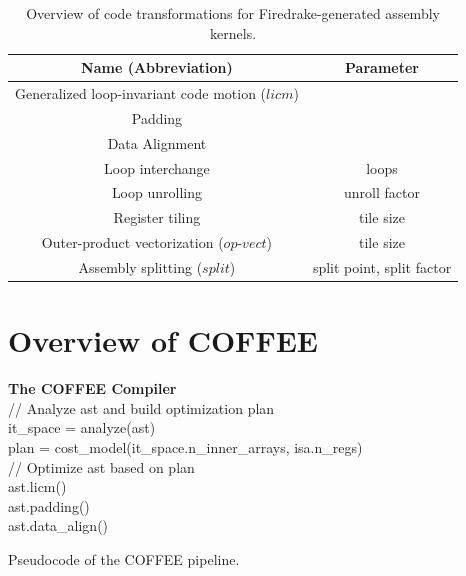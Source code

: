 \documentclass[conference]{IEEEtran}
\begin{document}
\begin{table}[h]
\begin{center}
\begin{tabulary}{1.0\columnwidth}{|C|C|}
\hline
Name (Abbreviation) & Parameter \\\hline\hline
Generalized loop-invariant code motion ($licm$) &   \\ \hline
Padding &  \\ \hline
Data Alignment & \\ \hline
Loop interchange      & loops  \\ \hline
Loop unrolling  & unroll factor \\ \hline
Register tiling & tile size \\ \hline
Outer-product vectorization ($op$-$vect$) & tile size \\ \hline
Assembly splitting ($split$) & split point, split factor \\ \hline
\end{tabulary}
\end{center}
\caption{Overview of code transformations for Firedrake-generated assembly kernels.}
\label{table:code-transformations}
\end{table}


\section{Overview of COFFEE}
\label{sec:pyop2-compiler}

\begin{algorithm}[t]
\label{algo:PyOP2Compiler}
  \textbf{The COFFEE Compiler}\\
// Analyze ast and build optimization plan \\
it\_space = analyze(ast) \\
plan = cost\_model(it\_space.n\_inner\_arrays, isa.n\_regs) \\
// Optimize ast based on plan \\
ast.licm() \\
ast.padding() \\
ast.data\_align() \\
\caption{Pseudocode of the COFFEE pipeline.}
\end{algorithm}
\end{document}
